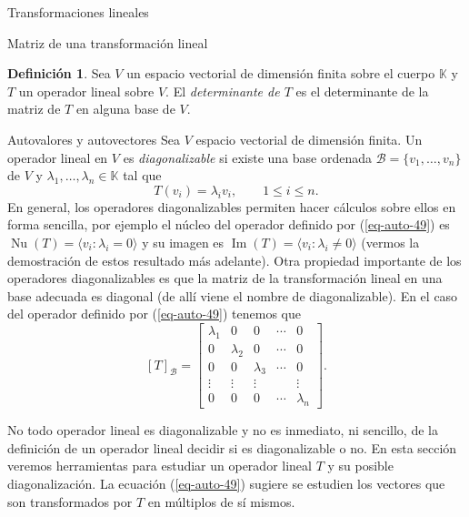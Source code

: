 \documentclass[a4paper,12pt,twoside,spanish]{amsbook}
\theoremstyle{definition}
\newtheorem{definicion}{Definici\'on}[section]
\theoremstyle{remark}
\newcommand{\img}{\operatorname{Im}}
\newcommand{\nuc}{\operatorname{Nu}}
\newcommand{\K}{\mathbb K}
\begin{document}
\begin{chapter}{Transformaciones lineales}
\begin{section}{Matriz de una transformación lineal}
		\begin{definicion} 
				Sea $V$ un espacio vectorial de dimensión finita sobre el cuerpo $\K$ y $T$ un operador lineal sobre $V$. El \textit{determinante de $T$} es el determinante de la matriz de $T$ en alguna base de $V$.  
		\end{definicion}
		\end{section}
	
	
	
	
	
	
	
		\begin{section}{Autovalores y autovectores}
		Sea $V$ espacio vectorial de dimensión finita. Un operador lineal en $V$ es \textit{diagonalizable}  si existe una base ordenada $\mathcal B= \{v_1,\ldots,v_n\}$ de $V$ y $\lambda_1,\ldots,\lambda_n \in \K$ tal que 
		\begin{equation}\label{eq-auto-49}
			T(v_i) = \lambda_i v_i,\qquad 1\le i \le n. 
		\end{equation}
		En  general, los operadores diagonalizables permiten hacer cálculos sobre ellos en forma sencilla, por ejemplo el núcleo del  operador definido por (\ref{eq-auto-49}) es $\nuc(T)=\langle v_i: \lambda_i =0 \rangle$ y  su imagen es $\img(T)=\langle v_i: \lambda_i \not=0 \rangle$ (vermos la demostración de estos resultado más adelante). 
		Otra propiedad importante de los operadores diagonalizables es que la matriz de la transformación lineal en una base adecuada es diagonal (de allí viene el nombre de diagonalizable). En  el caso del  operador definido por (\ref{eq-auto-49}) tenemos que
		$$
		[T]_{\mathcal B} = 
		\begin{bmatrix}
		\lambda_1&0&0&\cdots&0 \\
		0&\lambda_2&0&\cdots&0\\
		0&0&\lambda_3&\cdots&0\\
		\vdots&\vdots&\vdots&&\vdots\\
		0&0&0&\cdots&\lambda_n
		\end{bmatrix}.
		$$
		
		
		No todo operador lineal es diagonalizable y no es inmediato, ni sencillo, de la definición de un operador lineal decidir si es diagonalizable o no. En esta sección veremos herramientas para estudiar un operador lineal $T$ y su posible diagonalización. La ecuación (\ref{eq-auto-49}) sugiere se estudien los vectores que son transformados por $T$ en múltiplos de sí mismos.
		

\end{section}
\end{chapter}
\end{document}
